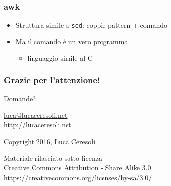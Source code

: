 \documentclass[xetex,table]{beamer}
\begin{document}
\begin{frame}
  \frametitle{awk}
  \begin{itemize}
  \item Struttura simile a \texttt{sed}: coppie pattern + comando
  \item Ma il comando è un vero programma
    \begin{itemize}
    \item linguaggio simile al C
    \end{itemize}
  \end{itemize}
\end{frame}

\begin{frame}
  \frametitle{Grazie per l'attenzione!}

  \begin{center}
    {\Huge Domande?}

    \vspace{0.1\textheight}

    \href{mailto:luca@lucaceresoli.net}{luca@lucaceresoli.net}\\
    \url{http://lucaceresoli.net}

    \textcopyright{} Copyright 2016, Luca Ceresoli\\

    \vspace{0.2\textheight}

    \tiny
    Materiale rilasciato sotto licenza\\
    Creative Commons Attribution - Share Alike 3.0 \\
    \url{https://creativecommons.org/licenses/by-sa/3.0/} \\
\end{center}
\end{frame}
\end{document}
